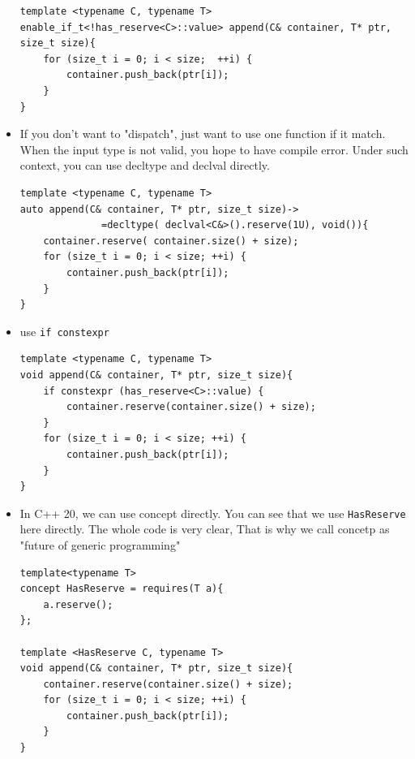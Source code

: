 \documentclass[a4paper,11pt,twoside]{book}
\begin{document}
\begin{itemize}
\begin{lstlisting}
template <typename C, typename T>
enable_if_t<!has_reserve<C>::value> append(C& container, T* ptr, size_t size){
	for (size_t i = 0; i < size;  ++i) {
        container.push_back(ptr[i]); 
    }
}
\end{lstlisting}

	\item If you don't want to "dispatch", just want to use one function if it match.  When the input type is not valid, you hope to have compile error. Under such context, you can use decltype and declval directly.

\begin{lstlisting}[numbers=none]
template <typename C, typename T>
auto append(C& container, T* ptr, size_t size)-> 
              =decltype( declval<C&>().reserve(1U), void()){
	container.reserve( container.size() + size);
	for (size_t i = 0; i < size; ++i) {
		container.push_back(ptr[i]);
	}
}
\end{lstlisting}

\item use \texttt{if constexpr}
\begin{lstlisting}
template <typename C, typename T>
void append(C& container, T* ptr, size_t size){
    if constexpr (has_reserve<C>::value) {
        container.reserve(container.size() + size);
    }
    for (size_t i = 0; i < size; ++i) {
        container.push_back(ptr[i]);
    }
}   
\end{lstlisting}
\item In C++ 20, we can use concept directly.  You can see that we use \texttt{HasReserve} here directly. The whole code is very clear, That is why we call concetp as "future of generic programming" 
\begin{lstlisting}
template<typename T>
concept HasReserve = requires(T a){
    a.reserve();
};

template <HasReserve C, typename T>
void append(C& container, T* ptr, size_t size){
    container.reserve(container.size() + size);
    for (size_t i = 0; i < size; ++i) {
        container.push_back(ptr[i]);
    }
} 
\end{lstlisting}


\end{itemize}
\end{document}
